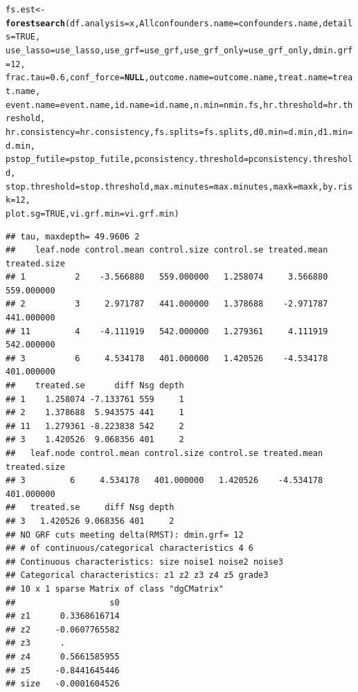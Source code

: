 \documentclass[smallextended]{svjour3}
\makeatletter
\newcommand{\hlnum}[1]{\textcolor[rgb]{0.686,0.059,0.569}{#1}}%
\newcommand{\hlstd}[1]{\textcolor[rgb]{0.345,0.345,0.345}{#1}}%
\newcommand{\hlkwa}[1]{\textcolor[rgb]{0.161,0.373,0.58}{\textbf{#1}}}%
\newcommand{\hlkwb}[1]{\textcolor[rgb]{0.69,0.353,0.396}{#1}}%
\newcommand{\hlkwc}[1]{\textcolor[rgb]{0.333,0.667,0.333}{#1}}%
\newcommand{\hlkwd}[1]{\textcolor[rgb]{0.737,0.353,0.396}{\textbf{#1}}}%
\newenvironment{kframe}{%
 \def\at@end@of@kframe{}%
 \ifinner\ifhmode%
  \def\at@end@of@kframe{\end{minipage}}%
  \begin{minipage}{\columnwidth}%
 \fi\fi%
 \def\FrameCommand##1{\hskip\@totalleftmargin \hskip-\fboxsep
 \colorbox{shadecolor}{##1}\hskip-\fboxsep
     \hskip-\linewidth \hskip-\@totalleftmargin \hskip\columnwidth}%
 \MakeFramed {\advance\hsize-\width
   \@totalleftmargin\z@ \linewidth\hsize
   \@setminipage}}%
 {\par\unskip\endMakeFramed%
 \at@end@of@kframe}
\newenvironment{knitrout}{}{} %
\makeatother
\begin{document}
\begin{knitrout}
\begin{kframe}
\begin{alltt}
\hlstd{fs.est} \hlkwb{<-} \hlkwd{forestsearch}\hlstd{(}\hlkwc{df.analysis} \hlstd{= x,} \hlkwc{Allconfounders.name} \hlstd{= confounders.name,} \hlkwc{details} \hlstd{=} \hlnum{TRUE}\hlstd{,}
    \hlkwc{use_lasso} \hlstd{= use_lasso,} \hlkwc{use_grf} \hlstd{= use_grf,} \hlkwc{use_grf_only} \hlstd{= use_grf_only,} \hlkwc{dmin.grf} \hlstd{=} \hlnum{12}\hlstd{,}
    \hlkwc{frac.tau} \hlstd{=} \hlnum{0.6}\hlstd{,} \hlkwc{conf_force} \hlstd{=} \hlkwa{NULL}\hlstd{,} \hlkwc{outcome.name} \hlstd{= outcome.name,} \hlkwc{treat.name} \hlstd{= treat.name,}
    \hlkwc{event.name} \hlstd{= event.name,} \hlkwc{id.name} \hlstd{= id.name,} \hlkwc{n.min} \hlstd{= nmin.fs,} \hlkwc{hr.threshold} \hlstd{= hr.threshold,}
    \hlkwc{hr.consistency} \hlstd{= hr.consistency,} \hlkwc{fs.splits} \hlstd{= fs.splits,} \hlkwc{d0.min} \hlstd{= d.min,} \hlkwc{d1.min} \hlstd{= d.min,}
    \hlkwc{pstop_futile} \hlstd{= pstop_futile,} \hlkwc{pconsistency.threshold} \hlstd{= pconsistency.threshold,}
    \hlkwc{stop.threshold} \hlstd{= stop.threshold,} \hlkwc{max.minutes} \hlstd{= max.minutes,} \hlkwc{maxk} \hlstd{= maxk,} \hlkwc{by.risk} \hlstd{=} \hlnum{12}\hlstd{,}
    \hlkwc{plot.sg} \hlstd{=} \hlnum{TRUE}\hlstd{,} \hlkwc{vi.grf.min} \hlstd{= vi.grf.min)}
\end{alltt}
\begin{verbatim}
## tau, maxdepth= 49.9606 2 
##    leaf.node control.mean control.size control.se treated.mean treated.size
## 1          2    -3.566880   559.000000   1.258074     3.566880   559.000000
## 2          3     2.971787   441.000000   1.378688    -2.971787   441.000000
## 11         4    -4.111919   542.000000   1.279361     4.111919   542.000000
## 3          6     4.534178   401.000000   1.420526    -4.534178   401.000000
##    treated.se      diff Nsg depth
## 1    1.258074 -7.133761 559     1
## 2    1.378688  5.943575 441     1
## 11   1.279361 -8.223838 542     2
## 3    1.420526  9.068356 401     2
##   leaf.node control.mean control.size control.se treated.mean treated.size
## 3         6     4.534178   401.000000   1.420526    -4.534178   401.000000
##   treated.se     diff Nsg depth
## 3   1.420526 9.068356 401     2
## NO GRF cuts meeting delta(RMST): dmin.grf= 12 
## # of continuous/categorical characteristics 4 6 
## Continuous characteristics: size noise1 noise2 noise3 
## Categorical characteristics: z1 z2 z3 z4 z5 grade3 
## 10 x 1 sparse Matrix of class "dgCMatrix"
##                   s0
## z1      0.3368616714
## z2     -0.0607765582
## z3      .           
## z4      0.5661585955
## z5     -0.8441645446
## size   -0.0001604526

\end{verbatim}
\end{kframe}
\end{knitrout}
\end{document}
